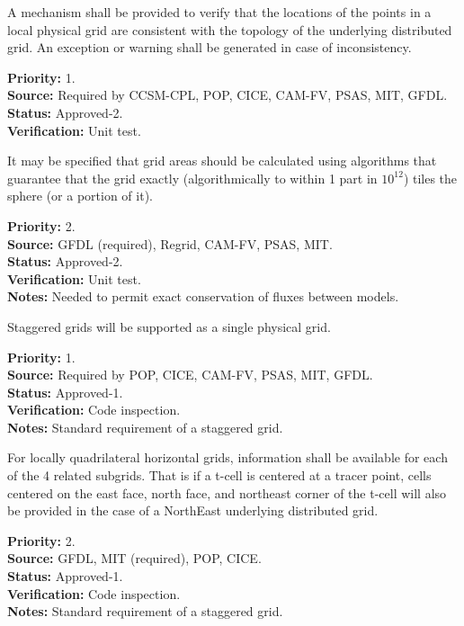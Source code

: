 A mechanism shall be provided to verify that the locations of the points in
a local physical grid are consistent with the topology of the underlying distributed grid.  An
exception or warning shall be generated in case of inconsistency.
\begin{reqlist}
{\bf Priority:} 1. \\
{\bf Source:} Required by CCSM-CPL, POP, CICE, 
CAM-FV, PSAS, MIT, GFDL.  \\
{\bf Status:} Approved-2. \\
{\bf Verification:} Unit test.
\end{reqlist}

It may be specified that grid areas should be calculated using algorithms that
guarantee that the grid exactly (algorithmically to within 1 part in $10^{12}$) tiles
the sphere (or a portion of it). 
\begin{reqlist}
{\bf Priority:} 2. \\
{\bf Source:} GFDL (required), Regrid, CAM-FV, PSAS, MIT.  \\
{\bf Status:} Approved-2. \\
{\bf Verification:} Unit test.\\
{\bf Notes:} Needed to permit exact conservation of fluxes between models.
\end{reqlist}

Staggered grids will be supported as a single physical grid.
\begin{reqlist}
{\bf Priority:} 1. \\
{\bf Source:} Required by POP, CICE, CAM-FV, PSAS, MIT, GFDL.  \\
{\bf Status:} Approved-1. \\
{\bf Verification:} Code inspection.\\
{\bf Notes:} Standard requirement of a staggered grid.
\end{reqlist}

For locally quadrilateral horizontal grids, information shall be available for
each of the 4 related subgrids.  That is if a t-cell is centered at a tracer
point,  cells centered on the east face, north face, and northeast corner of
the t-cell will also be provided in the case of a NorthEast underlying
distributed grid.
\begin{reqlist}
{\bf Priority:} 2. \\
{\bf Source:} GFDL, MIT (required), POP, CICE. \\
{\bf Status:} Approved-1. \\
{\bf Verification:} Code inspection.\\
{\bf Notes:} Standard requirement of a staggered grid.
\end{reqlist}

